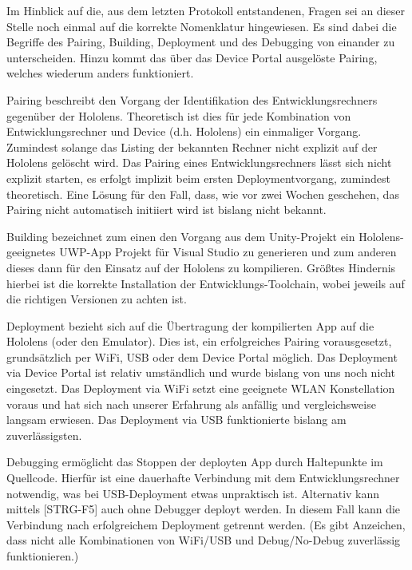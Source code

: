 \documentclass[conference, 11pt]{IEEEtran}
\begin{document}
Im Hinblick auf die, aus dem letzten Protokoll entstandenen, Fragen sei an dieser Stelle noch einmal auf die korrekte Nomenklatur hingewiesen. Es sind dabei die Begriffe des Pairing, Building, Deployment und des Debugging von einander zu unterscheiden. Hinzu kommt das über das Device Portal ausgelöste Pairing, welches wiederum anders funktioniert.
\begin{LaTeXdescription}
	\item[Pairing] beschreibt den Vorgang der Identifikation des Entwicklungsrechners gegenüber der Hololens. Theoretisch ist dies für jede Kombination von Entwicklungsrechner und Device (d.h. Hololens) ein einmaliger Vorgang. Zumindest solange das Listing der bekannten Rechner nicht explizit auf der Hololens gelöscht wird. Das Pairing eines Entwicklungsrechners lässt sich nicht explizit starten, es erfolgt implizit beim ersten Deploymentvorgang, zumindest theoretisch. Eine Lösung für den Fall, dass, wie vor zwei Wochen geschehen, das Pairing nicht automatisch initiiert wird ist bislang nicht bekannt.
	\item[Building] bezeichnet zum einen den Vorgang aus dem Unity-Projekt ein Hololens-geeignetes UWP-App Projekt für Visual Studio zu generieren und zum anderen dieses dann für den Einsatz auf der Hololens zu kompilieren. Größtes Hindernis hierbei ist die korrekte Installation der Entwicklungs-Toolchain, wobei jeweils auf die richtigen Versionen zu achten ist.
    \item[Deployment] bezieht sich auf die Übertragung der kompilierten App auf die Hololens (oder den Emulator). Dies ist, ein erfolgreiches Pairing vorausgesetzt, grundsätzlich per WiFi, USB oder dem Device Portal möglich. Das Deployment via Device Portal ist relativ umständlich und wurde bislang von uns noch nicht eingesetzt. Das Deployment via WiFi setzt eine geeignete WLAN Konstellation voraus und hat sich nach unserer Erfahrung als anfällig und vergleichsweise langsam erwiesen. Das Deployment via USB funktionierte bislang am zuverlässigsten.
    \item[Debugging] ermöglicht das Stoppen der deployten App durch Haltepunkte im Quellcode. Hierfür ist eine dauerhafte Verbindung mit dem Entwicklungsrechner notwendig, was bei USB-Deployment etwas unpraktisch ist. Alternativ kann mittels [STRG-F5] auch ohne Debugger deployt werden. In diesem Fall kann die Verbindung nach erfolgreichem Deployment getrennt werden. (Es gibt Anzeichen, dass nicht alle Kombinationen von WiFi/USB und Debug/No-Debug zuverlässig funktionieren.)
\end{LaTeXdescription}
\end{document}
